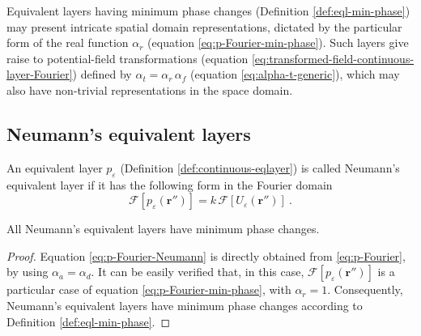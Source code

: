 Equivalent layers having minimum phase changes (Definition \ref{def:eql-min-phase}) may present intricate 
spatial domain representations, dictated by the particular form of the real function $\alpha_{r}$
(equation \ref{eq:p-Fourier-min-phase}).
Such layers give raise to potential-field transformations (equation \ref{eq:transformed-field-continuous-layer-Fourier})
defined by $\alpha_{t} = \alpha_{r} \, \alpha_{f}$ (equation \ref{eq:alpha-t-generic}), which may also
have non-trivial representations in the space domain.

\subsection{Neumann's equivalent layers}

\begin{definition}
	An equivalent layer $p_{\varepsilon}$ (Definition \ref{def:continuous-eqlayer}) is called Neumann's equivalent 
	layer if it has the following form in the Fourier domain
	\begin{equation}
		\mathcal{F} [ p_{\varepsilon}(\mathbf{r}'') ] =
		k \, \mathcal{F} [ U_{\varepsilon}(\mathbf{r}'') ] \: .
		\label{eq:p-Fourier-Neumann}
	\end{equation}
	\label{def:eql-Neumann}
\end{definition}
\begin{proposition}
	All Neumann's equivalent layers have minimum phase changes.
	\label{prop:eql-Neumann}
\end{proposition}
\begin{proof}
	Equation \ref{eq:p-Fourier-Neumann} is directly obtained from \ref{eq:p-Fourier}, by using 
	$\alpha_{a} = \alpha_{d}$. It can be easily verified that, in this case, 
	$\mathcal{F} [ p_{\varepsilon}(\mathbf{r}'') ]$ is a particular case of equation \ref{eq:p-Fourier-min-phase},
	with $\alpha_{r} = 1$. Consequently, Neumann's equivalent layers have minimum phase changes
	according to Definition \ref{def:eql-min-phase}.
\end{proof}

